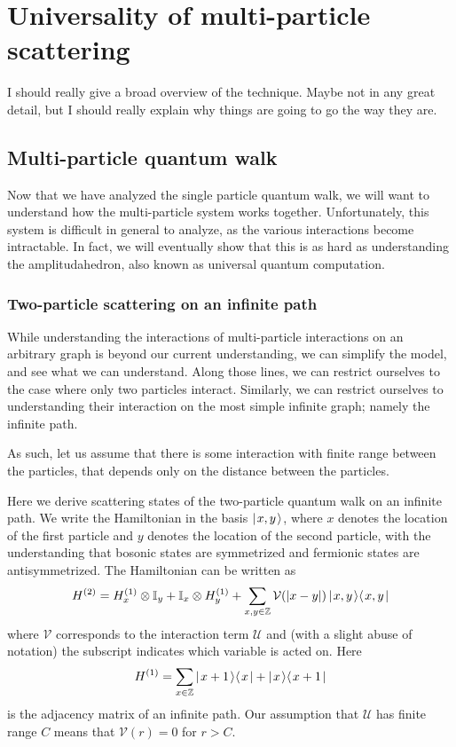 \documentclass[../thesis-main/thesis-main]{subfiles}
\begin{document}
\chapter{Universality of multi-particle scattering}


I should really give a broad overview of the technique.  Maybe not in any great detail, but I should really explain why things are going to go the way they are.



\section{Multi-particle quantum walk}

Now that we have analyzed the single particle quantum walk, we will want to understand how the multi-particle system works together.  Unfortunately, this system is difficult in general to analyze, as the various interactions become intractable.  In fact, we will eventually show that this is as hard as understanding the amplitudahedron, also known as universal quantum computation.


\subsection{Two-particle scattering on an infinite path}

While understanding the interactions of multi-particle interactions on an arbitrary graph is beyond our current understanding, we can simplify the model, and see what we can understand.  Along those lines, we can restrict ourselves to the case where only two particles interact.  Similarly, we can restrict ourselves to understanding their interaction on the most simple infinite graph; namely the infinite path.

As such, let us assume that there is some interaction with finite range between the particles, that depends only on the distance between the particles.  


Here we derive scattering states of the two-particle quantum walk on an infinite path. We write the Hamiltonian in the basis $|\mspace{2mu} x,y \mspace{2mu} \rangle$, where $x$ denotes the location of the first particle and $y$ denotes the location of the second particle, with the understanding that bosonic states are symmetrized and fermionic states are antisymmetrized. The Hamiltonian  can be written as
\begin{equation}
  H^{(2)} = H^{(1)}_x \otimes \mathbb{I}_y + \mathbb{I}_x \otimes H^{(1)}_y + \sum_{x,y\in\mathbb{Z}} 
     \mathcal{V}(|x-y|) \, |\mspace{2mu} x,y \mspace{2mu} \rangle\langle\mspace{2mu} x,y \mspace{2mu} |\label{eq:twoham}
\end{equation}
where $\mathcal{V}$ corresponds to the interaction term $\mathcal{U}$ and (with a slight abuse of notation) the subscript indicates which variable is acted on. Here
\[
  H^{(1)} = \sum_{x\in\mathbb{Z}} |\mspace{2mu} x+1 \mspace{2mu} \rangle\langle\mspace{2mu} x \mspace{2mu} | + |\mspace{2mu} x \mspace{2mu} \rangle\langle\mspace{2mu} x+1 \mspace{2mu} |
\]
is the adjacency matrix of an infinite path. Our assumption that $\mathcal{U}$ has finite range $C$ means that $\mathcal{V}(r)= 0$ for $r>C$.  
\end{document}
